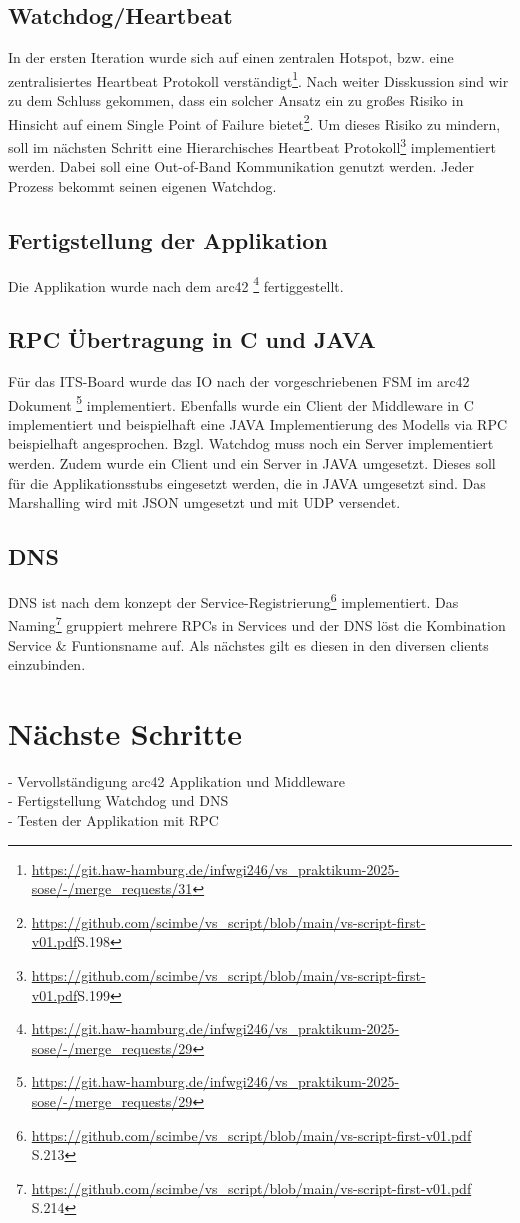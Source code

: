 \documentclass{article}
\begin{document}
\subsection{Watchdog/Heartbeat}
In der ersten Iteration wurde sich auf einen zentralen Hotspot, bzw. eine zentralisiertes Heartbeat Protokoll verständigt\footnote{\url{https://git.haw-hamburg.de/infwgi246/vs_praktikum-2025-sose/-/merge_requests/31}}.
Nach weiter Disskussion sind wir zu dem Schluss gekommen, dass ein solcher Ansatz ein zu großes Risiko in Hinsicht auf einem Single Point of Failure bietet\footnote{\url{https://github.com/scimbe/vs_script/blob/main/vs-script-first-v01.pdf}S.198 }.
Um dieses Risiko zu mindern, soll im nächsten Schritt eine Hierarchisches Heartbeat Protokoll\footnote{\url{https://github.com/scimbe/vs_script/blob/main/vs-script-first-v01.pdf}S.199} implementiert werden. Dabei soll eine Out-of-Band Kommunikation genutzt werden. 
Jeder Prozess bekommt seinen eigenen Watchdog.  

\subsection{Fertigstellung der Applikation}
Die Applikation wurde nach dem arc42 \footnote{\url{https://git.haw-hamburg.de/infwgi246/vs_praktikum-2025-sose/-/merge_requests/29}} fertiggestellt.

\subsection{RPC Übertragung in C und JAVA}

Für das ITS-Board wurde das IO nach der vorgeschriebenen FSM im arc42 Dokument \footnote{\url{https://git.haw-hamburg.de/infwgi246/vs_praktikum-2025-sose/-/merge_requests/29}} implementiert. Ebenfalls wurde ein Client der Middleware in C implementiert und beispielhaft eine JAVA Implementierung des Modells via RPC beispielhaft angesprochen. 
Bzgl. Watchdog muss noch ein Server implementiert werden. 
Zudem wurde ein Client und ein Server in JAVA umgesetzt. Dieses soll für die Applikationsstubs eingesetzt werden, die in JAVA umgesetzt sind. Das Marshalling wird mit JSON umgesetzt und mit UDP versendet.

\subsection{DNS}

DNS ist nach dem konzept der Service-Registrierung\footnote{\url{https://github.com/scimbe/vs_script/blob/main/vs-script-first-v01.pdf} S.213} implementiert. 
Das Naming\footnote{\url{https://github.com/scimbe/vs_script/blob/main/vs-script-first-v01.pdf} S.214} gruppiert mehrere RPCs in Services und der DNS löst die Kombination Service \& Funtionsname auf.
Als nächstes gilt es diesen in den diversen clients einzubinden.

\section{Nächste Schritte}
- Vervollständigung arc42 Applikation und Middleware\\
- Fertigstellung Watchdog und DNS\\
- Testen der Applikation mit RPC
\end{document}
